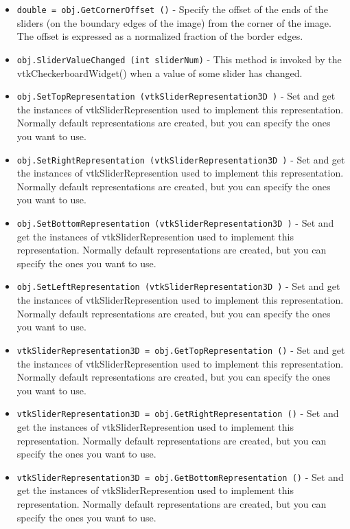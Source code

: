 \begin{itemize}
\item  \verb|double = obj.GetCornerOffset ()| -  Specify the offset of the ends of the sliders (on the boundary edges of
 the image) from the corner of the image. The offset is expressed as a
 normalized fraction of the border edges.

\item  \verb|obj.SliderValueChanged (int sliderNum)| -  This method is invoked by the vtkCheckerboardWidget() when a value of some
 slider has changed.

\item  \verb|obj.SetTopRepresentation (vtkSliderRepresentation3D )| -  Set and get the instances of vtkSliderRepresention used to implement this
 representation. Normally default representations are created, but you can
 specify the ones you want to use.

\item  \verb|obj.SetRightRepresentation (vtkSliderRepresentation3D )| -  Set and get the instances of vtkSliderRepresention used to implement this
 representation. Normally default representations are created, but you can
 specify the ones you want to use.

\item  \verb|obj.SetBottomRepresentation (vtkSliderRepresentation3D )| -  Set and get the instances of vtkSliderRepresention used to implement this
 representation. Normally default representations are created, but you can
 specify the ones you want to use.

\item  \verb|obj.SetLeftRepresentation (vtkSliderRepresentation3D )| -  Set and get the instances of vtkSliderRepresention used to implement this
 representation. Normally default representations are created, but you can
 specify the ones you want to use.

\item  \verb|vtkSliderRepresentation3D = obj.GetTopRepresentation ()| -  Set and get the instances of vtkSliderRepresention used to implement this
 representation. Normally default representations are created, but you can
 specify the ones you want to use.

\item  \verb|vtkSliderRepresentation3D = obj.GetRightRepresentation ()| -  Set and get the instances of vtkSliderRepresention used to implement this
 representation. Normally default representations are created, but you can
 specify the ones you want to use.

\item  \verb|vtkSliderRepresentation3D = obj.GetBottomRepresentation ()| -  Set and get the instances of vtkSliderRepresention used to implement this
 representation. Normally default representations are created, but you can
 specify the ones you want to use.


\end{itemize}
